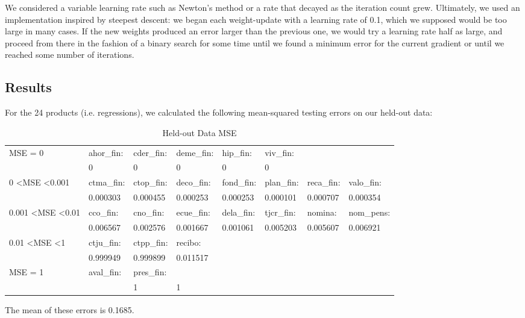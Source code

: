 \documentclass{article}
\begin{document}
\begin{spacing}{1}
\begin{large}
We considered a variable learning rate such as Newton's method or a rate that decayed as the iteration count grew. Ultimately, we used an implementation inspired by steepest descent: we began each weight-update with a learning rate of 0.1, which we supposed would be too large in many cases. \cite{book2} If the new weights produced an error larger than the previous one, we would try a learning rate half as large, and proceed from there in the fashion of a binary search for some time until we found a minimum error for the current gradient or until we reached some number of iterations.

\subsection{Results}

For the 24 products (i.e. regressions), we calculated the following mean-squared testing errors on our held-out data:

\begin{table}[h]\footnotesize
	\centering
	\caption{Held-out Data MSE}
	\label{my-label}
	\begin{tabular}{llllllll}
		\hline
		MSE = 0                            & ahor\_fin:  & cder\_fin: & deme\_fin: & hip\_fin:  & viv\_fin:  &                     &            \\
		& 0                    & 0          & 0          & 0          & 0          &                     &            \\ \hline
		0 \textless MSE \textless 0.001      & ctma\_fin:          & ctop\_fin: & deco\_fin: & fond\_fin: & plan\_fin: & reca\_fin:  & valo\_fin: \\
		& 0.000303            & 0.000455   & 0.000253   & 0.000253   & 0.000101   &  0.000707             & 0.000354   \\ \hline
		0.001 \textless MSE \textless 0.01 & cco\_fin:           & cno\_fin:  & ecue\_fin: & dela\_fin: & tjcr\_fin: & nomina:             & nom\_pens: \\
		& 0.006567            & 0.002576   & 0.001667   & 0.001061   & 0.005203   & 0.005607            & 0.006921   \\ \hline
		0.01 \textless MSE \textless 1     & ctju\_fin:          & ctpp\_fin: & recibo:    &            &            &                     &            \\
		& 0.999949            & 0.999899   & 0.011517   &            &            &                     &            \\ \hline
		MSE = 1                            & aval\_fin:          & pres\_fin: &            &            &            &                     &\\
		&                    & 1          &1           &            &            &                     & \\
		\hline
	\end{tabular}
\end{table}
The mean of these errors is 0.1685.


\end{large}
\end{spacing}
\end{document}
